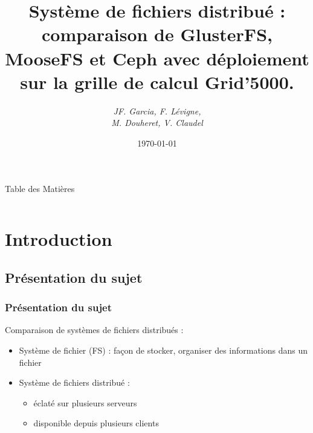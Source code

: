 \documentclass[blue]{beamer}
\title[Système de fichiers distribué]{Système de fichiers distribué : comparaison de GlusterFS, MooseFS et Ceph avec déploiement sur la grille de calcul Grid’5000.}
\author{\it JF. Garcia, F. Lévigne, \\M. Douheret, V. Claudel}
\date{\today}
\begin{document}
\titlepage
\begin{frame}{Table des Matières}
\begin{columns}[t]
\begin{column}{5cm}
\tableofcontents[sections={1-4}, hideothersubsections]
\end{column}
\begin{column}{5cm}
\tableofcontents[sections={5-8},hideothersubsections]
\end{column}
\end{columns}
\end{frame}
\section{Introduction}
	\subsection{Présentation du sujet}
	\begin{frame}
		\frametitle{Présentation du sujet}
		Comparaison de systèmes de fichiers distribués :
		\begin{itemize}
			\item Système de fichier (FS) : façon de stocker, organiser des informations dans un fichier
			\item Système de fichiers distribué :
			\begin{itemize}
				\item éclaté sur plusieurs serveurs %
				\item disponible depuis plusieurs clients
			\end{itemize}
		\end{itemize}
	\end{frame}
\end{document}
